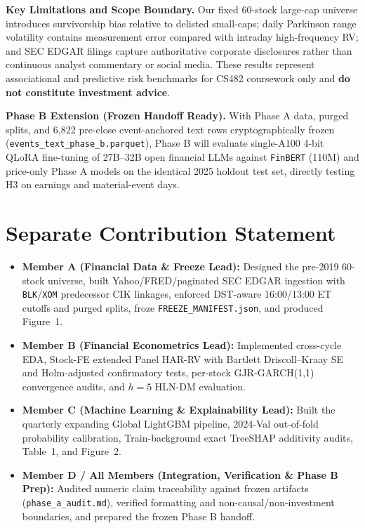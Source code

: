 \documentclass[11pt,a4paper]{article}
\begin{document}
\textbf{Key Limitations and Scope Boundary.} Our fixed 60-stock
large-cap universe introduces survivorship bias relative to delisted small-caps;
daily Parkinson range volatility contains measurement error compared with
intraday high-frequency RV; and SEC EDGAR filings capture authoritative
corporate disclosures rather than continuous analyst commentary or social media.
These results represent associational and predictive risk benchmarks for CS482
coursework only and \textbf{do not constitute investment advice}.

\textbf{Phase B Extension (Frozen Handoff Ready).} With Phase A data, purged
splits, and 6,822 pre-close event-anchored text rows
cryptographically frozen (\texttt{events\_text\_phase\_b.parquet}), Phase B
will evaluate single-A100 4-bit QLoRA fine-tuning of 27B--32B open financial
LLMs against \texttt{FinBERT} (110M) and price-only Phase A models on the
identical 2025 holdout test set, directly testing H3 on earnings and
material-event days.

\clearpage



\clearpage
\section*{Separate Contribution Statement}
\begin{itemize}\setlength{\itemsep}{2pt}
\item \textbf{Member A (Financial Data \& Freeze Lead):} Designed the pre-2019
60-stock universe, built Yahoo/FRED/paginated SEC EDGAR ingestion with
\texttt{BLK}/\texttt{XOM} predecessor CIK linkages, enforced DST-aware
16:00/13:00 ET cutoffs and purged splits, froze \texttt{FREEZE\_MANIFEST.json},
and produced Figure~1.
\item \textbf{Member B (Financial Econometrics Lead):} Implemented cross-cycle
EDA, Stock-FE extended Panel HAR-RV with Bartlett Driscoll--Kraay SE and
Holm-adjusted confirmatory tests, per-stock GJR-GARCH(1,1) convergence audits,
and $h=5$ HLN-DM evaluation.
\item \textbf{Member C (Machine Learning \& Explainability Lead):} Built the
quarterly expanding Global LightGBM pipeline, 2024-Val out-of-fold probability
calibration, Train-background exact TreeSHAP additivity audits, Table~1, and
Figure~2.
\item \textbf{Member D / All Members (Integration, Verification \& Phase B
Prep):} Audited numeric claim traceability against frozen artifacts
(\texttt{phase\_a\_audit.md}), verified formatting and
non-causal/non-investment boundaries, and prepared the frozen Phase B handoff.
\end{itemize}
\end{document}
